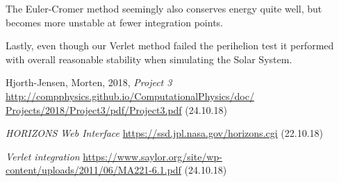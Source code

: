 \documentclass{emulateapj}
\begin{document}
The Euler-Cromer method seemingly also conserves energy quite well, but becomes more unstable at fewer integration points.

Lastly, even though our Verlet method failed the perihelion test it performed with overall reasonable stability when simulating the Solar System.



%
%

\begin{acknowledgements}
  
\end{acknowledgements}

\begin{thebibliography}{}
 Hjorth-Jensen, Morten, 2018, \textit{Project 3} \url{http://compphysics.github.io/ComputationalPhysics/doc/
Projects/2018/Project3/pdf/Project3.pdf} (24.10.18)

 \textit{HORIZONS Web Interface} \url{https://ssd.jpl.nasa.gov/horizons.cgi} (22.10.18)

 \textit{Verlet integration} \url{https://www.saylor.org/site/wp-content/uploads/2011/06/MA221-6.1.pdf} (24.10.18)
\end{thebibliography}
\end{document}
